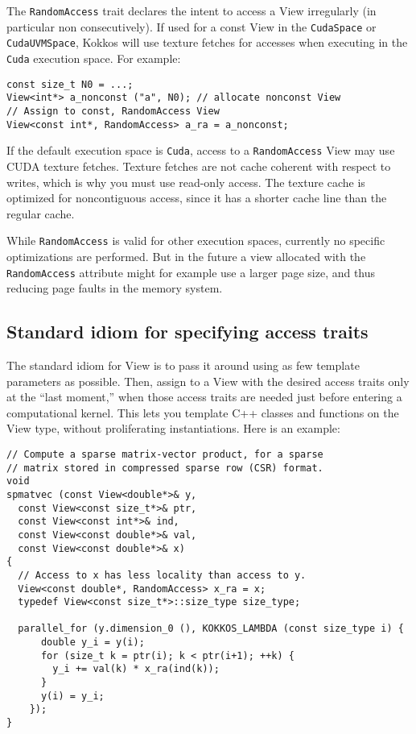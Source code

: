 The \lstinline|RandomAccess| trait declares the intent to access a View
irregularly (in particular non consecutively). If used for a const View 
in the \lstinline|CudaSpace| or \lstinline|CudaUVMSpace|, Kokkos will use 
texture fetches for accesses when executing in the \lstinline|Cuda| execution
space.
For example:
\begin{lstlisting}
const size_t N0 = ...;
View<int*> a_nonconst ("a", N0); // allocate nonconst View
// Assign to const, RandomAccess View
View<const int*, RandomAccess> a_ra = a_nonconst;
\end{lstlisting}
If the default execution space is \lstinline!Cuda!, access to a
\lstinline!RandomAccess! View may use CUDA texture fetches.  Texture
fetches are not cache coherent with respect to writes, which is why
you must use read-only access.  The texture cache is optimized for
noncontiguous access, since it has a shorter cache line than the
regular cache.

While \lstinline!RandomAccess! is valid for other execution spaces, 
currently no specific optimizations are performed. But in the future a view
allocated with the \lstinline!RandomAccess! attribute might for example
use a larger page size, and thus reducing page faults in the memory 
system.

\subsection{Standard idiom for specifying access traits}

The standard idiom for View is to pass it around using as few template
parameters as possible.  Then, assign to a View with the desired
access traits only at the ``last moment,'' when those access traits
are needed just before entering a computational kernel.  This lets you
template C++ classes and functions on the View type, without
proliferating instantiations.  Here is an example:

\begin{lstlisting}
// Compute a sparse matrix-vector product, for a sparse
// matrix stored in compressed sparse row (CSR) format.
void
spmatvec (const View<double*>& y, 
  const View<const size_t*>& ptr,
  const View<const int*>& ind,
  const View<const double*>& val,
  const View<const double*>& x)
{
  // Access to x has less locality than access to y.
  View<const double*, RandomAccess> x_ra = x;
  typedef View<const size_t*>::size_type size_type;

  parallel_for (y.dimension_0 (), KOKKOS_LAMBDA (const size_type i) {
      double y_i = y(i);
      for (size_t k = ptr(i); k < ptr(i+1); ++k) {
        y_i += val(k) * x_ra(ind(k));
      }
      y(i) = y_i;
    });
}
\end{lstlisting}

